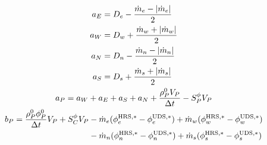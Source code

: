 \begin{gather}
	\begin{align}
		a_E &= D_e - \frac{\dot{m}_e - \abs{\dot{m}_e}}{2} \\
		a_W &= D_w + \frac{\dot{m}_w + \abs{\dot{m}_w}}{2} \\
		a_N &= D_n - \frac{\dot{m}_n - \abs{\dot{m}_n}}{2} \\
		a_S &= D_s + \frac{\dot{m}_s + \abs{\dot{m}_s}}{2}
	\end{align} \\
	a_P = a_W + a_E + a_S + a_N + \frac{\rho_P^0 V_P}{\Delta t} - S_P^\phi V_P \\
	\begin{align}
		b_P = \frac{\rho_P^0 \phi_P^0}{\Delta t} V_P + S_C^\phi V_P 
		&- \dot{m}_e (\phi_e^{\text{HRS},\ast} - \phi_e^{\text{UDS},\ast}) 
		+ \dot{m}_w (\phi_w^{\text{HRS},\ast} - \phi_w^{\text{UDS},\ast}) \nonumber \\
		&- \dot{m}_n (\phi_n^{\text{HRS},\ast} - \phi_n^{\text{UDS},\ast}) 
		+ \dot{m}_s (\phi_s^{\text{HRS},\ast} - \phi_s^{\text{UDS},\ast})
	\end{align}
\end{gather}





